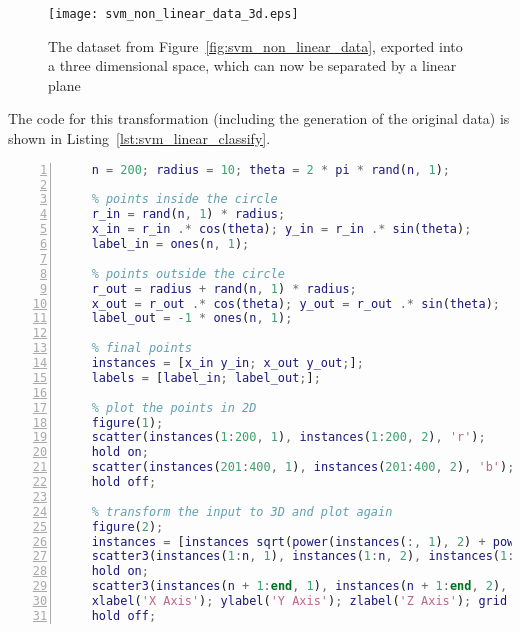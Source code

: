 \begin{figure}[t!]
    \centering
    \texttt{[image: svm\_non\_linear\_data\_3d.eps]}
    \caption{The dataset from Figure~\ref{fig:svm_non_linear_data}, exported into a three dimensional space, which can now be separated by a linear plane}
    \label{fig:svm_non_linear_data_3d}
\end{figure}

The code for this transformation (including the generation of the original data) is shown in Listing~\ref{lst:svm_linear_classify}.\\

\begin{lstlisting}[language=Matlab,frame=single,captionpos=b,caption={Generating the dataset to be classified by a linear classifier},breaklines=true,label={lst:svm_linear_classify},flexiblecolumns=true,showspaces=false,showstringspaces=false,numbers=left,numberstyle=\tiny\color{black},showtabs=false]
    % constants
    n = 200; radius = 10; theta = 2 * pi * rand(n, 1);
    
    % points inside the circle
    r_in = rand(n, 1) * radius;
    x_in = r_in .* cos(theta); y_in = r_in .* sin(theta);
    label_in = ones(n, 1);
    
    % points outside the circle
    r_out = radius + rand(n, 1) * radius;
    x_out = r_out .* cos(theta); y_out = r_out .* sin(theta);
    label_out = -1 * ones(n, 1);

    % final points
    instances = [x_in y_in; x_out y_out;];
    labels = [label_in; label_out;];

    % plot the points in 2D
    figure(1);
    scatter(instances(1:200, 1), instances(1:200, 2), 'r');
    hold on;
    scatter(instances(201:400, 1), instances(201:400, 2), 'b');
    hold off;

    % transform the input to 3D and plot again
    figure(2);
    instances = [instances sqrt(power(instances(:, 1), 2) + power(instances(:, 2), 2))];
    scatter3(instances(1:n, 1), instances(1:n, 2), instances(1:n, 3), 'r');
    hold on;
    scatter3(instances(n + 1:end, 1), instances(n + 1:end, 2), instances(n + 1:end, 3), 'b');
    xlabel('X Axis'); ylabel('Y Axis'); zlabel('Z Axis'); grid on;
    hold off;
\end{lstlisting}
